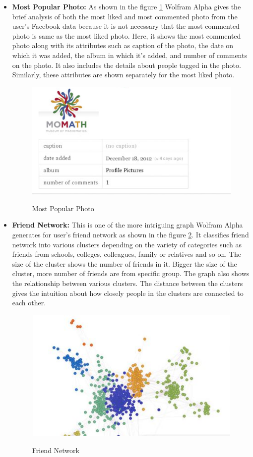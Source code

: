 \documentclass[12pt]{ucthesis}
\newcommand{\captionfonts}{\small\bf\ssp}
\begin{document}
\begin{itemize}
\item \textbf{Most Popular Photo:}
	As shown in the figure \ref{MostPopularPhoto} Wolfram Alpha gives the brief analysis of both the most liked and most commented photo from the user's Facebook data because it is not necessary that the most commented photo is same as the most liked photo. Here, it shows the most commented photo along with its attributes such as caption of the photo, the date on which it was added, the album in which it's added, and number of comments on the photo. It also includes the details about people tagged in the photo. Similarly, these attributes are shown separately for the most liked photo.
\begin{figure}[!htb]
\centering
\includegraphics{WolframMostCommentedPhoto.PNG}
\captionfonts
\caption[Most Popular Photo]{Most Popular Photo}
\label{MostPopularPhoto}
\end{figure} 
\item \textbf{Friend Network:}	
	This is one of the more intriguing graph Wolfram Alpha generates for user's friend network as shown in the figure \ref{FriendNetwork}. It classifies friend network into various clusters depending on the variety of categories such as friends from schools, colleges, colleagues, family or relatives and so on. The size of the cluster shows the number of friends in it. Bigger the size of the cluster, more number of friends are from specific group. The graph also shows the relationship between various clusters. The distance between the clusters gives the intuition about how closely people in the clusters are connected to each other.
\begin{figure}[!htb]
\centering
\includegraphics[height=65mm,width=150mm]{WolframFriendNetwork.JPG}
\captionfonts
\caption[Friend Network]{Friend Network}
\label{FriendNetwork}
\end{figure}
\end{itemize}
\end{document}
